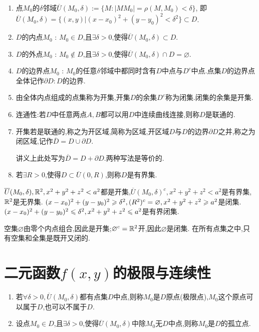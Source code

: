 \begin{enumerate}
    \item 点$M_0$的$\delta$邻域$\overline U(M_0,\delta) := \{ M : |MM_0| = \rho(M,M_0) < \delta \}$,
    即$\overline U(M_0,\delta) = \{ (x,y) | (x-x_0)^2 + (y-y_0)^2 < \delta^2 \} \subset D$.
    \item $D$的内点$M_0$ : $M_0 \in D$,且$\exists \delta > 0 $,使得$\overline U(M_0,\delta) \subset D$.
    \item $D$的外点$M_0$ : $M_0 \notin D$,且$\exists \delta > 0 $,使得$\overline U(M_0,\delta) \cap D = \varnothing$.
    \item $D$的边界点$M_0$ : $M_0$的任意$\delta$邻域中都同时含有$D$中点与$D^c$中点.点集$D$的边界点全体记作$\partial D: D$的边界.
    \item 由全体内点组成的点集称为开集,开集$D$的余集$D^c$称为闭集.闭集的余集是开集.
    \item 连通性:若$D$中任意两点$A,B$都可以用$D$中连续曲线连接,则称$D$是联通的.
    \item 开集若是联通的,称之为开区域,简称为区域,开区域$D$与$D$的边界$\partial D$之并,称之为闭区域,记作$\overline D = D \cup \partial D$.
    \begin{remark}
    讲义上此处写为$\overline{D} = D + \partial D$.两种写法是等价的.
\end{remark}
    \item 若$\exists R >0$,使得$D \subset \overline{U}(0,R)$,则称$D$是有界集.
\end{enumerate}

\begin{example}
    $\overline U(M_0,\delta), \mathbb{R}^2, x^2+y^2+z^2<a^2$都是开集,$\overline U(M_0,\delta)^c, x^2+y^2+z^2 < a^2$是有界集,$\mathbb{R}^2$是无界集.
    $(x-x_0)^2 + (y-y_0)^2 \geqslant \delta^2, (R^2)^c = \varnothing, x^2+y^2+z^2 \geqslant a^2$是闭集.
    $(x-x_0)^2 + (y-y_0)^2 \leqslant \delta^2, x^2+y^2+z^2 \leqslant a^2$是有界闭集.
\end{example}

\begin{example}
    空集$\varnothing$由零个内点组合,因此是开集;$\varnothing^c = \mathbb{R}^2$开,因此$\varnothing$是闭集.
    在所有点集之中,只有空集和全集是既开又闭的.
\end{example}

\section{二元函数$f(x,y)$的极限与连续性}

\begin{enumerate}
    \item 若$\forall \delta >0, \overline U(M_0,\delta)$都有点集$D$中点,则称$M_0$是$D$原点(极限点),$M_0$这个原点可以属于$D$,也可以不属于$D$.
    \item 设点$M_0 \in D$,且$\exists \delta > 0 $,使得$\overline U(M_0,\delta)$中除$M_0$无$D$中点,则称$M_0$是$D$的孤立点.
\end{enumerate}

